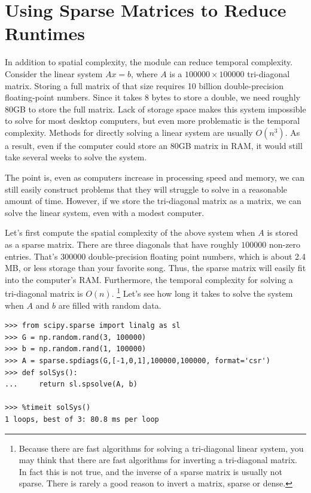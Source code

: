 \section*{Using Sparse Matrices to Reduce Runtimes} %

In addition to spatial complexity, the  module can reduce temporal complexity.
Consider the linear system $A x = b$, where $A$ is a $100000\times 100000$ tri-diagonal matrix.
Storing a full matrix of that size requires 10 billion double-precision floating-point numbers.
Since it takes 8 bytes to store a double, we need roughly 80GB to store the full matrix.
Lack of storage space makes this system impossible to solve for most desktop computers, but even more problematic is the temporal complexity.
Methods for directly solving a linear system are usually $O(n^3)$.
As a result, even if the computer could store an 80GB matrix in RAM, it would still take several weeks to solve the system.

The point is, even as computers increase in processing speed and memory, we can still easily construct problems that they will struggle to solve in a reasonable amount of time.
However, if we store the tri-diagonal matrix as a  matrix, we can solve the linear system, even with a modest computer.

Let's first compute the spatial complexity of the above system when $A$ is stored as a sparse matrix.
There are three diagonals that have roughly $100000$ non-zero entries.
That's $300000$ double-precision floating point numbers, which is about 2.4 MB, or less storage than your favorite song.
Thus, the sparse matrix will easily fit into the computer's RAM. Furthermore, the temporal complexity for solving a tri-diagonal matrix is $O(n)$.
\footnote{Because there are fast algorithms for solving a tri-diagonal linear system, you may think that there are fast algorithms for inverting a tri-diagonal matrix.
In fact this is not true, and the inverse of a sparse matrix is usually not sparse.
There is rarely a good reason to invert a matrix, sparse or dense.}
Let's see how long it takes to solve the system when $A$ and $b$ are filled with random data.

\begin{lstlisting}
>>> from scipy.sparse import linalg as sl
>>> G = np.random.rand(3, 100000)
>>> b = np.random.rand(1, 100000)
>>> A = sparse.spdiags(G,[-1,0,1],100000,100000, format='csr')
>>> def solSys():
...     return sl.spsolve(A, b)

>>> %timeit solSys()
1 loops, best of 3: 80.8 ms per loop

\end{lstlisting}

